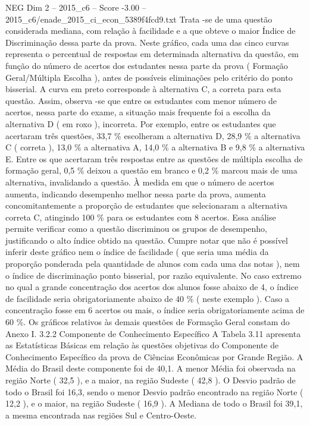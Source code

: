 \begin{textsample}{NEG Dim 2 – 2015\_c6 – Score -3.00 – 2015\_c6/enade\_2015\_ci\_econ\_5389f4fcd9.txt}
Trata -se de uma questão considerada mediana, com relação à facilidade e a que obteve o maior Índice de Discriminação dessa parte da prova.
Neste gráfico, cada uma das cinco curvas representa o percentual de respostas em determinada alternativa da questão, em função do número de acertos dos estudantes nessa parte da prova ( Formação Geral/Múltipla Escolha ), antes de possíveis eliminações pelo critério do ponto bisserial.
A curva em preto corresponde à alternativa C, a correta para esta questão.
Assim, observa -se que entre os estudantes com menor número de acertos, nessa parte do exame, a situação mais frequente foi a escolha da alternativa D ( em roxo ), incorreta.
Por exemplo, entre os estudantes que acertaram três questões, 33,7 \% escolheram a alternativa D, 28,9 \% a alternativa C ( correta ), 13,0 \% a alternativa A, 14,0 \% a alternativa B e 9,8 \% a alternativa E.
Entre os que acertaram três respostas entre as questões de múltipla escolha de formação geral, 0,5 \% deixou a questão em branco e 0,2 \% marcou mais de uma alternativa, invalidando a questão.
À medida em que o número de acertos aumenta, indicando desempenho melhor nessa parte da prova, aumenta concomitantemente a proporção de estudantes que selecionaram a alternativa correta C, atingindo 100 \% para os estudantes com 8 acertos.
Essa análise permite verificar como a questão discriminou os grupos de desempenho, justificando o alto índice obtido na questão.
Cumpre notar que não é possível inferir deste gráfico nem o índice de facilidade ( que seria uma média da proporção ponderada pela quantidade de alunos com cada uma das notas ), nem o índice de discriminação ponto bisserial, por razão equivalente.
No caso extremo no qual a grande concentração dos acertos dos alunos fosse abaixo de 4, o índice de facilidade seria obrigatoriamente abaixo de 40 \% ( neste exemplo ).
Caso a concentração fosse em 6 acertos ou mais, o índice seria obrigatoriamente acima de 60 \%.
Os gráficos relativos às demais questões de Formação Geral constam do Anexo I. 3.2.2 Componente de Conhecimento Específico A Tabela 3.11 apresenta as Estatísticas Básicas em relação às questões objetivas do Componente de Conhecimento Específico da prova de Ciências Econômicas por Grande Região.
A Média do Brasil deste componente foi de 40,1.
A menor Média foi observada na região Norte ( 32,5 ), e a maior, na região Sudeste ( 42,8 ).
O Desvio padrão de todo o Brasil foi 16,3, sendo o menor Desvio padrão encontrado na região Norte ( 12,2 ), e o maior, na região Sudeste ( 16,9 ).
A Mediana de todo o Brasil foi 39,1, a mesma encontrada nas regiões Sul e Centro-Oeste.

\end{textsample}
